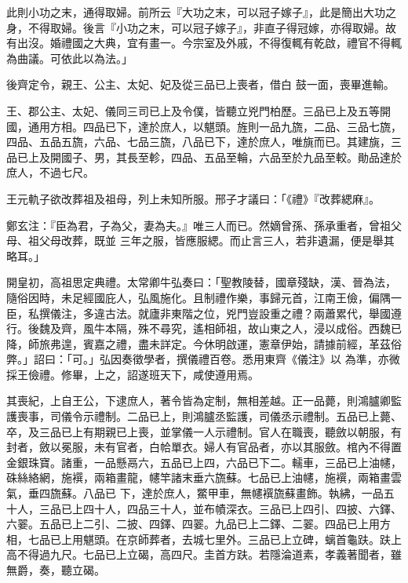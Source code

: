 \begin{pinyinscope}
 此則小功之末，通得取婦。前所云『大功之末，可以冠子嫁子』，此是簡出大功之身，不得取婦。後言『小功之末，可以冠子嫁子』，非直子得冠嫁，亦得取婦。故有出沒。婚禮國之大典，宜有畫一。今宗室及外戚，不得復輒有乾啟，禮官不得輒為曲議。可依此以為法。」



 後齊定令，親王、公主、太妃、妃及從三品已上喪者，借白
 鼓一面，喪畢進輸。



 王、郡公主、太妃、儀同三司已上及令僕，皆聽立兇門柏歷。三品已上及五等開國，通用方相。四品已下，達於庶人，以魌頭。旌則一品九旒，二品、三品七旒，四品、五品五旒，六品、七品三旒，八品已下，達於庶人，唯旐而已。其建旐，三品已上及開國子、男，其長至軫，四品、五品至輪，六品至於九品至較。勛品達於庶人，不過七尺。



 王元軌子欲改葬祖及祖母，列上未知所服。邢子才議曰：「《禮》『改葬緦麻』。



 鄭玄注：『臣為君，子為父，妻為夫。』唯三人而已。然嫡曾孫、孫承重者，曾祖父母、祖父母改葬，既並
 三年之服，皆應服緦。而止言三人，若非遺漏，便是舉其略耳。」



 開皇初，高祖思定典禮。太常卿牛弘奏曰：「聖教陵替，國章殘缺，漢、晉為法，隨俗因時，未足經國庇人，弘風施化。且制禮作樂，事歸元首，江南王儉，偏隅一臣，私撰儀注，多違古法。就廬非東階之位，兇門豈設重之禮？兩蕭累代，舉國遵行。後魏及齊，風牛本隔，殊不尋究，遙相師祖，故山東之人，浸以成俗。西魏已降，師旅弗遑，賓嘉之禮，盡未詳定。今休明啟運，憲章伊始，請據前經，革茲俗弊。」詔曰：「可。」弘因奏徵學者，撰儀禮百卷。悉用東齊《儀注》以
 為準，亦微採王儉禮。修畢，上之，詔遂班天下，咸使遵用焉。



 其喪紀，上自王公，下逮庶人，著令皆為定制，無相差越。正一品薨，則鴻臚卿監護喪事，司儀令示禮制。二品已上，則鴻臚丞監護，司儀丞示禮制。五品已上薨、卒，及三品已上有期親已上喪，並掌儀一人示禮制。官人在職喪，聽斂以朝服，有封者，斂以冕服，未有官者，白帢單衣。婦人有官品者，亦以其服斂。棺內不得置金銀珠寶。諸重，一品懸鬲六，五品已上四，六品已下二。轜車，三品已上油幰，硃絲絡網，施襈，兩箱畫龍，幰竿諸末垂六旒蘇。七品已上油幰，施襈，兩箱畫雲氣，垂四旒蘇。八品已
 下，達於庶人，鱉甲車，無幰襈旒蘇畫飾。執紼，一品五十人，三品已上四十人，四品三十人，並布幘深衣。三品已上四引、四披、六鐸、六翣。五品已上二引、二披、四鐸、四翣。九品已上二鐸、二翣。四品已上用方相，七品已上用魌頭。在京師葬者，去城七里外。三品已上立碑，螭首龜趺。趺上高不得過九尺。七品已上立碣，高四尺。圭首方趺。若隱淪道素，孝義著聞者，雖無爵，奏，聽立碣。




\end{pinyinscope}
